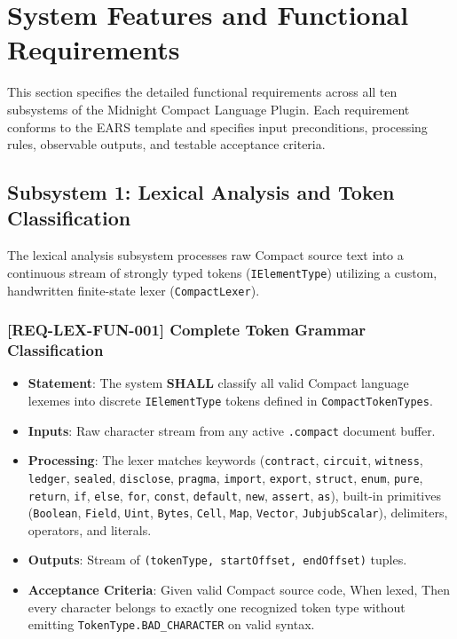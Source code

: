 \section{System Features and Functional Requirements}
\label{sec:system_features}

This section specifies the detailed functional requirements across all ten subsystems of the Midnight Compact Language Plugin. Each requirement conforms to the EARS template and specifies input preconditions, processing rules, observable outputs, and testable acceptance criteria.

\subsection{Subsystem 1: Lexical Analysis and Token Classification}
\label{sec:subsystem_lexer}

The lexical analysis subsystem processes raw Compact source text into a continuous stream of strongly typed tokens (\texttt{IElementType}) utilizing a custom, handwritten finite-state lexer (\texttt{CompactLexer}).

\subsubsection{[REQ-LEX-FUN-001] Complete Token Grammar Classification}
\begin{itemize}
    \item \textbf{Statement}: The system \textbf{SHALL} classify all valid Compact language lexemes into discrete \texttt{IElementType} tokens defined in \texttt{CompactTokenTypes}.
    \item \textbf{Inputs}: Raw character stream from any active \texttt{.compact} document buffer.
    \item \textbf{Processing}: The lexer matches keywords (\texttt{contract}, \texttt{circuit}, \texttt{witness}, \texttt{ledger}, \texttt{sealed}, \texttt{disclose}, \texttt{pragma}, \texttt{import}, \texttt{export}, \texttt{struct}, \texttt{enum}, \texttt{pure}, \texttt{return}, \texttt{if}, \texttt{else}, \texttt{for}, \texttt{const}, \texttt{default}, \texttt{new}, \texttt{assert}, \texttt{as}), built-in primitives (\texttt{Boolean}, \texttt{Field}, \texttt{Uint}, \texttt{Bytes}, \texttt{Cell}, \texttt{Map}, \texttt{Vector}, \texttt{JubjubScalar}), delimiters, operators, and literals.
    \item \textbf{Outputs}: Stream of \texttt{(tokenType, startOffset, endOffset)} tuples.
    \item \textbf{Acceptance Criteria}: Given valid Compact source code, When lexed, Then every character belongs to exactly one recognized token type without emitting \texttt{TokenType.BAD\_CHARACTER} on valid syntax.
\end{itemize}

